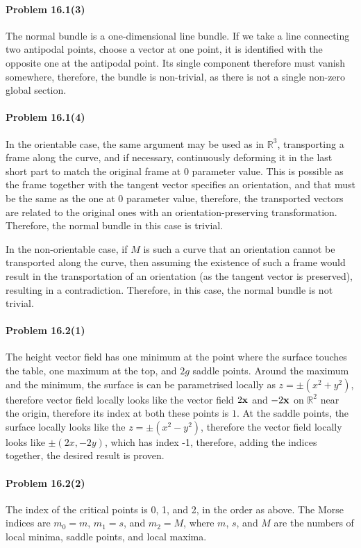 \documentclass[a4paper,12pt]{article}
\newcommand{\problem}[1]{\paragraph{Problem #1}}
\begin{document}

\problem{16.1(3)} The normal bundle is a one-dimensional line bundle. If we take a line connecting two antipodal points, choose a vector at one point, it is identified with the opposite one at the antipodal point. Its single component therefore must vanish somewhere, therefore, the bundle is non-trivial, as there is not a single non-zero global section.


\problem{16.1(4)} In the orientable case, the same argument may be used as in $\mathbb{R}^3$, transporting a frame along the curve, and if necessary, continuously deforming it in the last short part to match the original frame at 0 parameter value. This is possible as the frame together with the tangent vector specifies an orientation, and that must be the same as the one at 0 parameter value, therefore, the transported vectors are related to the original ones with an orientation-preserving transformation. Therefore, the normal bundle in this case is trivial.

In the non-orientable case, if $M$ is such a curve that an orientation cannot be transported along the curve, then assuming the existence of such a frame would result in the transportation of an orientation (as the tangent vector is preserved), resulting in a contradiction. Therefore, in this case, the normal bundle is not trivial.


\problem{16.2(1)} The height vector field has one minimum at the point where the surface touches the table, one maximum at the top, and $2g$ saddle points. Around the maximum and the minimum, the surface is can be parametrised locally as $z=\pm(x^2+y^2)$, therefore vector field locally looks like the vector field $2{\bf x}$ and $-2{\bf x}$ on $\mathbb{R}^2$ near the origin, therefore its index at both these points is $1$. At the saddle points, the surface locally looks like the $z=\pm(x^2-y^2)$, therefore the vector field locally looks like $\pm(2x, -2y)$, which has index -1, therefore, adding the indices together, the desired result is proven.


\problem{16.2(2)} The index of the critical points is 0, 1, and 2, in the order as above. The Morse indices are $m_0 = m$, $m_1=s$, and $m_2=M$, where $m$, $s$, and $M$ are the numbers of local minima, saddle points, and local maxima.
\end{document}
